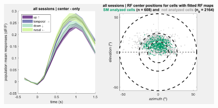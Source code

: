 \begin{figure}[H] \centering \includegraphics[width=12cm,height=12cm,keepaspectratio]{Figures/7.Results/population/sel/1_popPlots_rfPositions.png} 
\end{figure}


%
%


